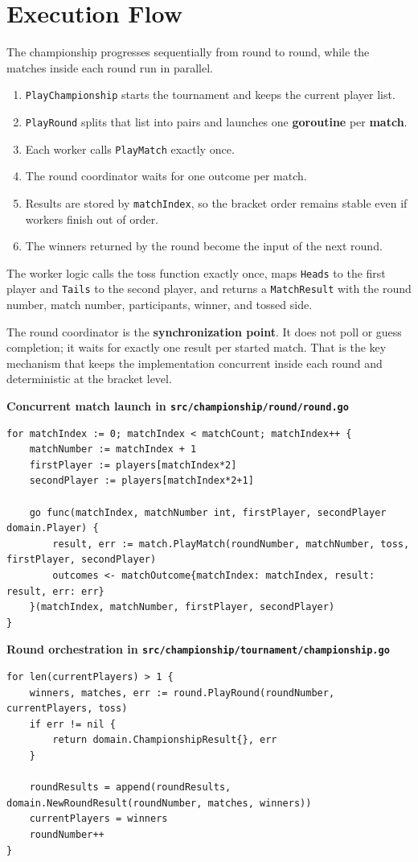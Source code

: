 \section{Execution Flow}

The championship progresses sequentially from round to round, while the matches inside each round run in parallel.

\begin{enumerate}
    \item \texttt{PlayChampionship} starts the tournament and keeps the current player list.
    \item \texttt{PlayRound} splits that list into pairs and launches one \textbf{goroutine} per \textbf{match}.
    \item Each worker calls \texttt{PlayMatch} exactly once.
    \item The round coordinator waits for one outcome per match.
    \item Results are stored by \texttt{matchIndex}, so the bracket order remains stable even if workers finish out of order.
    \item The winners returned by the round become the input of the next round.
\end{enumerate}

The worker logic calls the toss function exactly once, maps \texttt{Heads} to the first player and \texttt{Tails} to the
second player, and returns a
\texttt{MatchResult} with the round number, match number, participants, winner, and tossed side.

The round coordinator is the \textbf{synchronization point}.
It does not poll or guess completion; it waits for exactly one result per started match.
That is the key mechanism that keeps the implementation concurrent inside each round and deterministic at the bracket level.

\medskip

\noindent\textbf{Concurrent match launch in \texttt{src/championship/round/round.go}}
\begin{lstlisting}[style=reportcode]
for matchIndex := 0; matchIndex < matchCount; matchIndex++ {
    matchNumber := matchIndex + 1
    firstPlayer := players[matchIndex*2]
    secondPlayer := players[matchIndex*2+1]

    go func(matchIndex, matchNumber int, firstPlayer, secondPlayer domain.Player) {
        result, err := match.PlayMatch(roundNumber, matchNumber, toss, firstPlayer, secondPlayer)
        outcomes <- matchOutcome{matchIndex: matchIndex, result: result, err: err}
    }(matchIndex, matchNumber, firstPlayer, secondPlayer)
}
\end{lstlisting}

\noindent\textbf{Round orchestration in \texttt{src/championship/tournament/championship.go}}
\begin{lstlisting}[style=reportcode]
for len(currentPlayers) > 1 {
    winners, matches, err := round.PlayRound(roundNumber, currentPlayers, toss)
    if err != nil {
        return domain.ChampionshipResult{}, err
    }

    roundResults = append(roundResults, domain.NewRoundResult(roundNumber, matches, winners))
    currentPlayers = winners
    roundNumber++
}
\end{lstlisting}
